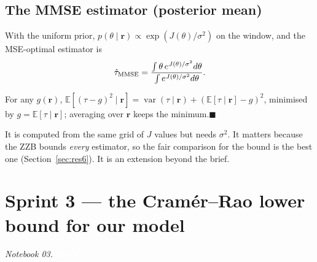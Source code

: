 \documentclass[11pt,a4paper]{article}
\newcommand{\done}{\colorbox{okgreen}{\textcolor{white}{\scriptsize\bfseries DONE}}}
\newcommand{\E}{\mathbb{E}}
\newcommand{\var}{\operatorname{var}}
\newcommand{\br}{\mathbf{r}}
\begin{document}
\subsection{The MMSE estimator (posterior mean)}
With the uniform prior, $p(\theta\mid\br)\propto\exp(J(\theta)/\sigma^2)$ on the window, and the MSE-optimal estimator is
\begin{equation}
\hat\tau_{\rm MMSE}=\frac{\int\theta\,e^{J(\theta)/\sigma^2}d\theta}{\int e^{J(\theta)/\sigma^2}d\theta}.
\end{equation}
\begin{proofbox}
For any $g(\br)$, $\E[(\tau-g)^2\mid\br]=\var(\tau\mid\br)+(\E[\tau\mid\br]-g)^2$, minimised by $g=\E[\tau\mid\br]$; averaging over
$\br$ keeps the minimum.\hfill$\blacksquare$
\end{proofbox}
It is computed from the same grid of $J$ values but needs $\sigma^2$. It matters because the ZZB bounds \emph{every}
estimator, so the fair comparison for the bound is the best one (Section~\ref{sec:res6}). It is an extension beyond the brief.

\section{Sprint 3 --- the Cramér--Rao lower bound for our model}\label{sec:crlb}
\textit{Notebook 03.} \done
\end{document}
